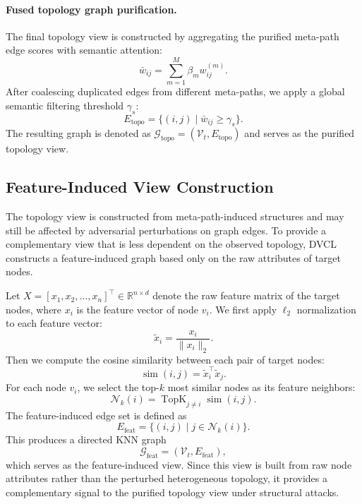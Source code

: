 \paragraph{Fused topology graph purification.}
The final topology view is constructed by aggregating the purified meta-path edge scores with semantic attention:
\begin{equation}
\bar{w}_{ij}
=
\sum_{m=1}^{M}
\beta_m w_{ij}^{(m)}.
\end{equation}
After coalescing duplicated edges from different meta-paths, we apply a global semantic filtering threshold $\gamma_s$:
\begin{equation}
E_{\mathrm{topo}}
=
\{(i,j)\mid \bar{w}_{ij}\geq \gamma_s\}.
\end{equation}
The resulting graph is denoted as
$\mathcal{G}_{\mathrm{topo}}=(\mathcal{V}_t,E_{\mathrm{topo}})$ and serves as the purified topology view.

\subsection{Feature-Induced View Construction}

The topology view is constructed from meta-path-induced structures and may still be affected by adversarial perturbations on graph edges. To provide a complementary view that is less dependent on the observed topology, DVCL constructs a feature-induced graph based only on the raw attributes of target nodes.

Let $X=[x_1,x_2,\ldots,x_n]^\top\in\mathbb{R}^{n\times d}$ denote the raw feature matrix of the target nodes, where $x_i$ is the feature vector of node $v_i$. We first apply $\ell_2$ normalization to each feature vector:
\begin{equation}
\tilde{x}_i
=
\frac{x_i}{\|x_i\|_2}.
\end{equation}
Then we compute the cosine similarity between each pair of target nodes:
\begin{equation}
\operatorname{sim}(i,j)
=
\tilde{x}_i^\top \tilde{x}_j.
\end{equation}
For each node $v_i$, we select the top-$k$ most similar nodes as its feature neighbors:
\begin{equation}
\mathcal{N}_k(i)
=
\operatorname{TopK}_{j\neq i}
\operatorname{sim}(i,j).
\end{equation}
The feature-induced edge set is defined as
\begin{equation}
E_{\mathrm{feat}}
=
\{(i,j)\mid j\in\mathcal{N}_k(i)\}.
\end{equation}
This produces a directed KNN graph
\begin{equation}
\mathcal{G}_{\mathrm{feat}}
=
(\mathcal{V}_t,E_{\mathrm{feat}}),
\end{equation}
which serves as the feature-induced view. Since this view is built from raw node attributes rather than the perturbed heterogeneous topology, it provides a complementary signal to the purified topology view under structural attacks.


